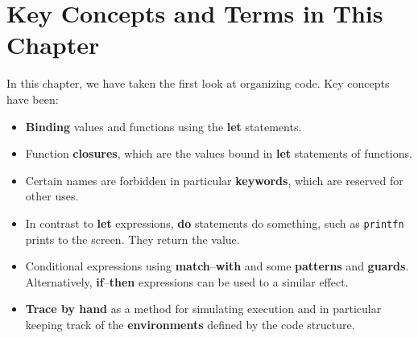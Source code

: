 \documentclass[fsharpNotes.tex]{subfiles}
\begin{document}
\section{Key Concepts and Terms in This Chapter}
In this chapter, we have taken the first look at organizing code. Key concepts have been:
\begin{itemize}
\item \textbf{Binding} values and functions using the \textbf{let} statements.
\item Function \textbf{closures}, which are the values bound in \textbf{let} statements of functions.
\item Certain names are forbidden in particular \textbf{keywords}, which are reserved for other uses. 
\item In contrast to \textbf{let} expressions, \textbf{do} statements do something, such as \lstinline{printfn} prints to the screen. They return the \lexeme{()} value.
\item Conditional expressions using \textbf{match}--\textbf{with} and some \textbf{patterns} and \textbf{guards}. Alternatively, \textbf{if}--\textbf{then} expressions can be used to a similar effect.
\item \textbf{Trace by hand} as a method for simulating execution and in particular keeping track of the \textbf{environments} defined by the code structure.
\end{itemize}
\end{document}
